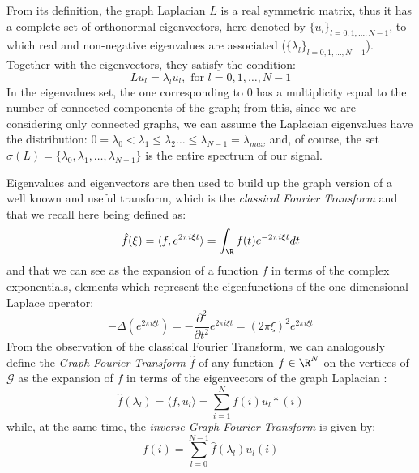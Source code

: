 From its definition, the graph Laplacian $L$ is a real symmetric matrix, thus it has a complete set of orthonormal eigenvectors, here denoted by $\{u_l\}_{l=0,1,\dots,N-1}$, to which real and non-negative eigenvalues are associated ($\{\lambda_l\}_{l=0,1,\dots,N-1}$). Together with the eigenvectors, they satisfy the condition:
\begin{equation}
L u_l = \lambda_l u_l, \text{   for  } l = 0,1,\dots,N-1
\end{equation}
In the eigenvalues set, the one corresponding to $0$ has a multiplicity equal to the number of connected components of the graph; from this, since we are considering only connected graphs, we can assume the Laplacian eigenvalues have the distribution: $0 = \lambda_0 < \lambda_1 \leq \lambda_2 \dots \leq \lambda_{N-1} = \lambda_{max}$ and, of course, the set $\sigma(L) = \{\lambda_0, \lambda_1,\dots,\lambda_{N-1}\}$ is the entire spectrum of our signal.

Eigenvalues and eigenvectors are then used to build up the graph version of a well known and useful transform, which is the \textit{classical Fourier Transform} and that we recall here being defined as:
\begin{equation}
\hat{f}(\xi) = \langle f, e^{2\pi i \xi t}\rangle = \int_{\R} f(t)e^{-2\pi i \xi t} dt
\end{equation}
and that we can see as the expansion of a function $f$ in terms of the complex exponentials, elements which represent the eigenfunctions of the one-dimensional Laplace operator:
\begin{equation}
-\Delta(e^{2\pi i \xi t}) = -\frac{\partial^2}{\partial t^2}e^{2\pi i \xi t} = (2\pi\xi)^2e^{2\pi i \xi t}
\end{equation}
From the observation of the classical Fourier Transform, we can analogously define the \textit{Graph Fourier Transform} $\hat{f}$ of any function $f \in \R^N$ on the vertices of $\mathcal{G}$ as the expansion of $f$ in terms of the eigenvectors of the graph Laplacian \cite{Shuman2013}:
\begin{equation}
\hat{f}(\lambda_l) = \langle f, u_l \rangle = \sum^{N}_{i=1}f(i)u_l*(i)
\end{equation}
while, at the same time, the \textit{inverse Graph Fourier Transform} is given by:
\begin{equation}
f(i) = \sum^{N-1}_{l = 0}\hat{f}(\lambda_l)u_l(i)
\end{equation}
